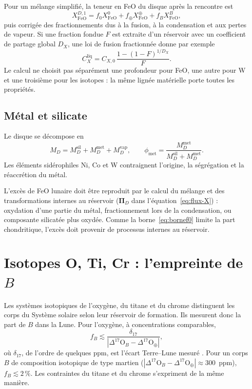 \documentclass[11pt,a4paper,openany]{report}
\begin{document}
Pour un mélange simplifié, la teneur en FeO du disque après la rencontre est
\begin{equation}
X^{D,1}_{\mathrm{FeO}}=f_0X^{0}_{\mathrm{FeO}}+f_\oplus X^{\oplus}_{\mathrm{FeO}}+f_BX^{B}_{\mathrm{FeO}},
\label{eq:FeO}
\end{equation}
puis corrigée des fractionnements dus à la fusion, à la condensation et aux pertes de vapeur. Si
une fraction fondue $F$ est extraite d'un réservoir avec un coefficient de partage global $D_X$,
une loi de fusion fractionnée donne par exemple
\begin{equation}
C_X^{\mathrm{liq}}=C_{X,0}\,\frac{1-(1-F)^{1/D_X}}{F}.
\label{eq:fusion}
\end{equation}
Le calcul ne choisit pas séparément une profondeur pour FeO, une autre pour W et une troisième
pour les isotopes : la même lignée matérielle porte toutes les propriétés.

\subsection{Métal et silicate}

Le disque se décompose en
\begin{equation}
M_D=M_D^{\mathrm{sil}}+M_D^{\mathrm{met}}+M_D^{\mathrm{vap}},
\qquad
\phi_{\mathrm{met}}=\frac{M_D^{\mathrm{met}}}{M_D^{\mathrm{sil}}+M_D^{\mathrm{met}}}.
\label{eq:metal}
\end{equation}
Les éléments sidérophiles Ni, Co et W contraignent l'origine, la ségrégation et la réaccrétion
du métal.


\begin{consequence}
L'excès de FeO lunaire doit être reproduit par le calcul du mélange et des transformations
internes au réservoir ($\boldsymbol{\Pi}_D$ dans l'équation~\eqref{eq:flux-X}) : oxydation d'une partie
du métal, fractionnement lors de la condensation, ou composante silicatée plus oxydée. Comme la
borne~\eqref{eq:bornef0} limite la part chondritique, l'excès doit provenir de processus internes au
réservoir.
\end{consequence}

\section{Isotopes O, Ti, Cr : l'empreinte de \texorpdfstring{$B$}{B}}
\label{sec:bornes}

Les systèmes isotopiques de l'oxygène, du titane et du chrome distinguent les corps du Système
solaire selon leur réservoir de formation. Ils mesurent donc la part de $B$ dans la Lune. Pour
l'oxygène, à concentrations comparables,
\begin{equation}
f_B\lesssim\frac{\delta_{17}}{|\Delta^{17}\mathrm{O}_B-\Delta^{17}\mathrm{O}_\oplus|},
\label{eq:bornefB}
\end{equation}
où $\delta_{17}$, de l'ordre de quelques ppm, est l'écart Terre--Lune mesuré \cite{Young2016}. Pour un
corps $B$ de composition isotopique de type martien
($|\Delta^{17}\mathrm{O}_B-\Delta^{17}\mathrm{O}_\oplus|\approx300$~ppm), $f_B\lesssim2\,\%$. Les
contraintes du titane \cite{Zhang2012} et du chrome s'expriment de la même manière.
\end{document}
